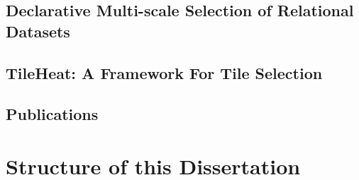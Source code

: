 \subsection{Declarative Multi-scale Selection of Relational Datasets}
\subsection{TileHeat: A Framework For Tile Selection}
\subsection{Publications}

\section{Structure of this Dissertation}
